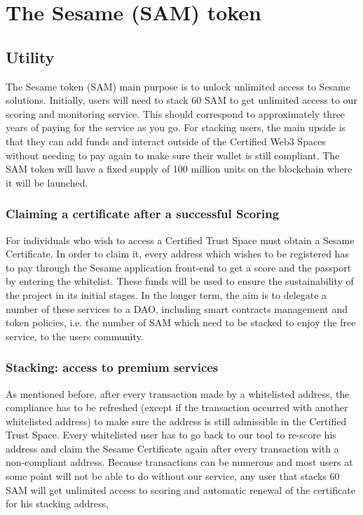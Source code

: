 ﻿\documentclass[a4paper]{article}
\let\OldTexttrademark\texttrademark
\renewcommand{\texttrademark}{\OldTexttrademark\xspace}%
\begin{document}
\newpage
\section{The Sesame (SAM) token}
\subsection{Utility}
The Sesame token (SAM) main purpose is to unlock unlimited access to Sesame solutions. Initially, users will need to stack 60 SAM to get unlimited access to our scoring and monitoring service. This should correspond to approximately three years of paying for the service as you go. For stacking users, the main upside is that they can add funds and interact outside of the Certified Web3 Spaces without needing to pay again to make sure their wallet is still compliant. The SAM token will have a fixed supply of 100 million units on the blockchain where it will be launched.
\subsubsection{Claiming a certificate after a successful Scoring} 
For individuals who wish to access a Certified Trust Space\texttrademark must obtain a Sesame Certificate. In order to claim it, every address which wishes to be registered has to pay through the Sesame application front-end to get a score and the passport by entering the whitelist. These funds will be used to ensure the sustainability of the project in its initial stages. In the longer term, the aim is to delegate a number of these services to a DAO, including smart contracts management and token policies, i.e. the number of SAM which need to be stacked to enjoy the free service, to the users community.
\subsubsection{Stacking: access to premium services}
As mentioned before, after every transaction made by a whitelisted address, the compliance has to be refreshed (except if the transaction occurred with another whitelisted address) to make sure the address is still admissible in the Certified Trust Space\OldTexttrademark. Every whitelisted user has to go back to our tool to re-score his address and claim the Sesame Certificate again after every transaction with a non-compliant address. Because transactions can be numerous and most users at some point will not be able to do without our service, any user that stacks 60 SAM will get unlimited access to scoring and automatic renewal of the certificate for his stacking address, 
\end{document}
